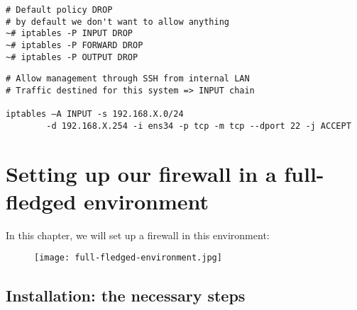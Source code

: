 \documentclass{article}
\begin{document}
\begin{verbatim}
# Default policy DROP
# by default we don't want to allow anything
~# iptables -P INPUT DROP
~# iptables -P FORWARD DROP
~# iptables -P OUTPUT DROP
\end{verbatim}

\begin{verbatim}
# Allow management through SSH from internal LAN
# Traffic destined for this system => INPUT chain

iptables –A INPUT -s 192.168.X.0/24 
        -d 192.168.X.254 -i ens34 -p tcp -m tcp --dport 22 -j ACCEPT
\end{verbatim}

\section{Setting up our firewall in a full-fledged environment}

In this chapter, we will set up a firewall in this environment:

\begin{figure}[H]
    \centering
    \texttt{[image: full-fledged-environment.jpg]}
\end{figure}

\subsection{Installation: the necessary steps}
\end{document}
